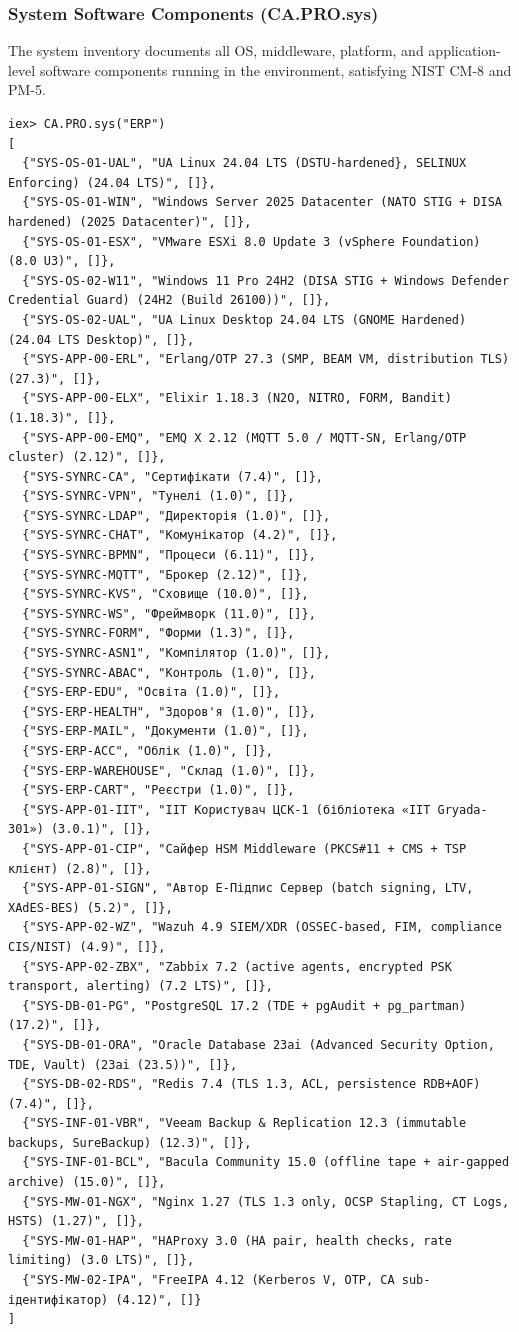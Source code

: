 \documentclass{article}
\begin{document}
\subsubsection{System Software Components (CA.PRO.sys)}
The system inventory documents all OS, middleware, platform, and application-level software
components running in the environment, satisfying NIST CM-8 and PM-5.
{\scriptsize
{}
\begin{verbatim}
iex> CA.PRO.sys("ERP")
[
  {"SYS-OS-01-UAL", "UA Linux 24.04 LTS (DSTU-hardened}, SELINUX Enforcing) (24.04 LTS)", []},
  {"SYS-OS-01-WIN", "Windows Server 2025 Datacenter (NATO STIG + DISA hardened) (2025 Datacenter)", []},
  {"SYS-OS-01-ESX", "VMware ESXi 8.0 Update 3 (vSphere Foundation) (8.0 U3)", []},
  {"SYS-OS-02-W11", "Windows 11 Pro 24H2 (DISA STIG + Windows Defender Credential Guard) (24H2 (Build 26100))", []},
  {"SYS-OS-02-UAL", "UA Linux Desktop 24.04 LTS (GNOME Hardened) (24.04 LTS Desktop)", []},
  {"SYS-APP-00-ERL", "Erlang/OTP 27.3 (SMP, BEAM VM, distribution TLS) (27.3)", []},
  {"SYS-APP-00-ELX", "Elixir 1.18.3 (N2O, NITRO, FORM, Bandit) (1.18.3)", []},
  {"SYS-APP-00-EMQ", "EMQ X 2.12 (MQTT 5.0 / MQTT-SN, Erlang/OTP cluster) (2.12)", []},
  {"SYS-SYNRC-CA", "Сертифікати (7.4)", []},
  {"SYS-SYNRC-VPN", "Тунелі (1.0)", []},
  {"SYS-SYNRC-LDAP", "Директорія (1.0)", []},
  {"SYS-SYNRC-CHAT", "Комунікатор (4.2)", []},
  {"SYS-SYNRC-BPMN", "Процеси (6.11)", []},
  {"SYS-SYNRC-MQTT", "Брокер (2.12)", []},
  {"SYS-SYNRC-KVS", "Сховище (10.0)", []},
  {"SYS-SYNRC-WS", "Фреймворк (11.0)", []},
  {"SYS-SYNRC-FORM", "Форми (1.3)", []},
  {"SYS-SYNRC-ASN1", "Компілятор (1.0)", []},
  {"SYS-SYNRC-ABAC", "Контроль (1.0)", []},
  {"SYS-ERP-EDU", "Освіта (1.0)", []},
  {"SYS-ERP-HEALTH", "Здоров'я (1.0)", []},
  {"SYS-ERP-MAIL", "Документи (1.0)", []},
  {"SYS-ERP-ACC", "Облік (1.0)", []},
  {"SYS-ERP-WAREHOUSE", "Склад (1.0)", []},
  {"SYS-ERP-CART", "Реєстри (1.0)", []},
  {"SYS-APP-01-IIT", "ІІТ Користувач ЦСК-1 (бібліотека «IIT Gryada-301») (3.0.1)", []},
  {"SYS-APP-01-CIP", "Сайфер HSM Middleware (PKCS#11 + CMS + TSP клієнт) (2.8)", []},
  {"SYS-APP-01-SIGN", "Автор Е-Підпис Сервер (batch signing, LTV, XAdES-BES) (5.2)", []},
  {"SYS-APP-02-WZ", "Wazuh 4.9 SIEM/XDR (OSSEC-based, FIM, compliance CIS/NIST) (4.9)", []},
  {"SYS-APP-02-ZBX", "Zabbix 7.2 (active agents, encrypted PSK transport, alerting) (7.2 LTS)", []},
  {"SYS-DB-01-PG", "PostgreSQL 17.2 (TDE + pgAudit + pg_partman) (17.2)", []},
  {"SYS-DB-01-ORA", "Oracle Database 23ai (Advanced Security Option, TDE, Vault) (23ai (23.5))", []},
  {"SYS-DB-02-RDS", "Redis 7.4 (TLS 1.3, ACL, persistence RDB+AOF) (7.4)", []},
  {"SYS-INF-01-VBR", "Veeam Backup & Replication 12.3 (immutable backups, SureBackup) (12.3)", []},
  {"SYS-INF-01-BCL", "Bacula Community 15.0 (offline tape + air-gapped archive) (15.0)", []},
  {"SYS-MW-01-NGX", "Nginx 1.27 (TLS 1.3 only, OCSP Stapling, CT Logs, HSTS) (1.27)", []},
  {"SYS-MW-01-HAP", "HAProxy 3.0 (HA pair, health checks, rate limiting) (3.0 LTS)", []},
  {"SYS-MW-02-IPA", "FreeIPA 4.12 (Kerberos V, OTP, CA sub-ідентифікатор) (4.12)", []}
]
\end{verbatim}
}
\end{document}
